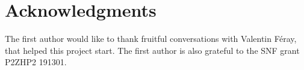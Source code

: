 \documentclass[12pt, reqno]{amsart}
\theoremstyle{definition}
\newcommand{\III}{\vec{\mathbf{I}}}
\newcommand{\JJJ}{\vec{\mathbf{J}}}
\begin{document}
%
%
%
%
%
%

\section*{Acknowledgments}

The first author would like to thank fruitful conversations with Valentin F\'eray, that helped this project start.
The first author is also grateful to the SNF grant P2ZHP2 191301.




\end{document}
